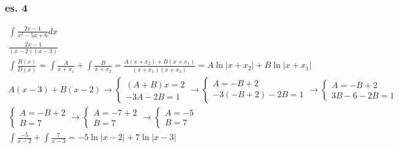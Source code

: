 \documentclass{article}
\newcommand{\abs}[1]{\lvert#1\rvert}
\begin{document}
\subsubsection{es. 4}
\begin{equation*}
	\begin{matrix}
		\int \frac{2x-1}{x^2-5x+6}dx\\
		\frac{2x-1}{(x-2)(x-3)}\\
		\int
		\frac{R(x)}{D(x)}=\int\frac{A}{x+x_1}+\int\frac{B}{x+x_2}=\frac{A(x+x_2)+B(x+x_1)}{(x+x_1)(x+x_2)}=A\ln\abs{x+x_2}+B\ln\abs{x+x_1}\\
		A(x-3)+B(x-2)\to \begin{cases}
			(A+B)x=2 \\
			-3A-2B=1
		\end{cases}\to \begin{cases}
			A=-B+2\\
			-3(-B+2)-2B=1
		\end{cases} \to \begin{cases}
			A=-B+2\\
			3B-6-2B=1
		\end{cases}\\
		\begin{cases}
			A=-B+2 \\
			B=7
		\end{cases} \to \begin{cases}
			A=-7+2\\
			B=7
		\end{cases} \to \begin{cases}
			A=-5\\
			B=7
		\end{cases}\\
		\int\frac{-5}{x-2}+\int \frac{7}{x-3}=-5\ln\abs{x-2}+7\ln\abs{x-3}
	\end{matrix}
\end{equation*}
\end{document}

